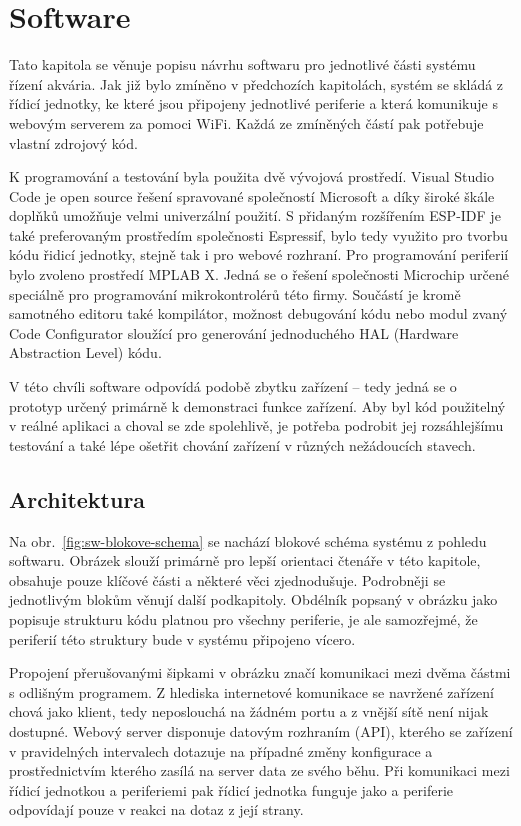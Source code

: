\chapter{Software}
    Tato kapitola se věnuje popisu návrhu softwaru pro jednotlivé části systému řízení akvária. Jak již bylo zmíněno v předchozích kapitolách, systém se skládá z řídicí jednotky, ke které jsou připojeny jednotlivé periferie a která komunikuje s webovým serverem za pomoci WiFi. Každá ze zmíněných částí pak potřebuje vlastní zdrojový kód. 
    
    K programování a testování byla použita dvě vývojová prostředí. Visual Studio Code je open source řešení spravované společností Microsoft a díky široké škále doplňků umožňuje velmi univerzální použití. S přidaným rozšířením ESP-IDF je také preferovaným prostředím společnosti Espressif, bylo tedy využito pro tvorbu kódu řidicí jednotky, stejně tak i pro webové rozhraní. Pro programování periferií bylo zvoleno prostředí MPLAB X. Jedná se o řešení společnosti Microchip určené speciálně pro programování mikrokontrolérů této firmy. Součástí je kromě samotného editoru také kompilátor, možnost debugování kódu nebo modul zvaný Code Configurator sloužící pro generování jednoduchého HAL (Hardware Abstraction Level) kódu.

    V této chvíli software odpovídá podobě zbytku zařízení -- tedy jedná se o prototyp určený primárně k demonstraci funkce zařízení. Aby byl kód použitelný v reálné aplikaci a choval se zde spolehlivě, je potřeba podrobit jej rozsáhlejšímu testování a také lépe ošetřit chování zařízení v různých nežádoucích stavech.   

\section{Architektura}
    Na obr.~\ref{fig:sw-blokove-schema} se nachází blokové schéma systému z pohledu softwaru. Obrázek slouží primárně pro lepší orientaci čtenáře v této kapitole, obsahuje pouze klíčové části a některé věci zjednodušuje. Podrobněji se jednotlivým blokům věnují další podkapitoly. Obdélník popsaný v obrázku jako  popisuje strukturu kódu platnou pro všechny periferie, je ale samozřejmé, že periferií této struktury bude v systému připojeno vícero.

    Propojení přerušovanými šipkami v obrázku značí komunikaci mezi dvěma částmi s odlišným programem. Z hlediska internetové komunikace se navržené zařízení chová jako klient, tedy neposlouchá na žádném portu a z vnější sítě není nijak dostupné. Webový server disponuje datovým rozhraním (API), kterého se zařízení v pravidelných intervalech dotazuje na případné změny konfigurace a prostřednictvím kterého zasílá na server data ze svého běhu. Při komunikaci mezi řídicí jednotkou a periferiemi pak řídicí jednotka funguje jako  a periferie odpovídají pouze v reakci na dotaz z její strany.

